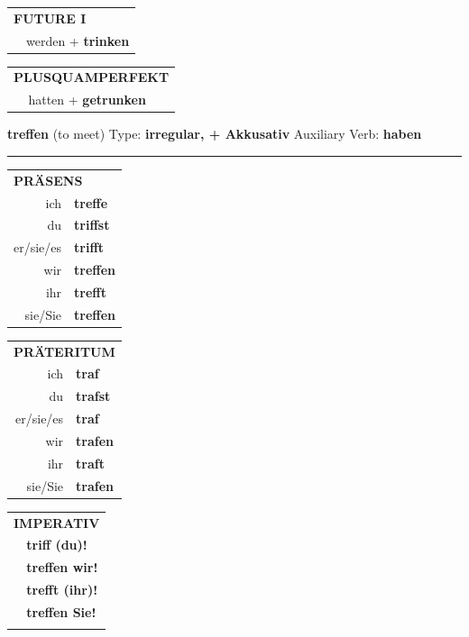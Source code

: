 \documentclass[10pt,a4paper]{revtex4-2}
\begin{document}
\begin{verbbox-acc}
\begin{tabular}{rl}
    \multicolumn{2}{l}{\textbf{FUTURE I} }\\
   & werden + \textbf{trinken}\\
 
  \end{tabular}
\hfill
   \begin{tabular}{rl}
      \multicolumn{2}{l}{\textbf{PLUSQUAMPERFEKT}}\\
   & hatten + \textbf{getrunken}\\
  \end{tabular}
  
  \vspace{-5pt}


\end{verbbox-acc}
\begin{verbbox-acc}
    {\Large \bf treffen} (to meet) \hfill Type: \textbf{irregular, + Akkusativ} \hfill Auxiliary Verb: \textbf{haben} 
    
     \vspace{5pt}

    \hrule
    
    \vspace{5pt}

  \begin{tabular}{rl}
     \multicolumn{2}{l}{\textbf{PRÄSENS} }\\
    ich & \textbf{treffe}\\
    du & \textbf{triffst}\\
    er/sie/es & \textbf{trifft}\\
    wir & \textbf{treffen}\\
    ihr & \textbf{trefft}\\
    sie/Sie & \textbf{treffen}\\
  \end{tabular}
  \hfill
     \begin{tabular}{rl}
    \multicolumn{2}{l}{\textbf{PRÄTERITUM} }\\
    ich & \textbf{traf}\\
    du & \textbf{trafst}\\
    er/sie/es & \textbf{traf}\\
    wir & \textbf{trafen}\\
    ihr & \textbf{traft}\\
    sie/Sie & \textbf{trafen}\\
  \end{tabular}
  \hfill
  \begin{tabular}{rl}
     \multicolumn{2}{l}{\textbf{IMPERATIV} }\\
   & \textbf{triff (du)!}\\
   & \textbf{treffen wir!}\\
   & \textbf{trefft (ihr)!}\\
   & \textbf{treffen Sie!}\\
   & \vspace{10pt}
  \end{tabular}


\end{verbbox-acc}
\end{document}
